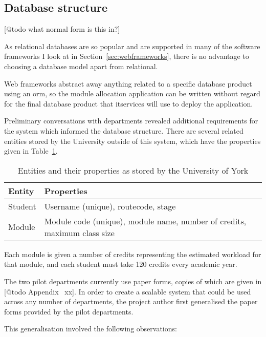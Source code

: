
\subsection{Database structure}

[@todo what normal form is this in?]

As relational databases are so popular and are supported in many of the
software frameworks I look at in Section~\ref{sec:webframeworks}, there is no
advantage to choosing a database model apart from relational.

Web frameworks abstract away anything related to a specific database product
using an \gls{orm}, so the module allocation application can be written
without regard for the final database product that \gls{itservices} will use
to deploy the application.

Preliminary conversations with departments revealed additional requirements
for the system which informed the database structure. There are several
related entities stored by the University outside of this system, which have
the properties given in Table~\ref{development_database_uni_entities}.

\begin{table}
  \begin{tabular}{ | l | l | }
    \hline
    \textbf{Entity} & \textbf{Properties} \\
    \hline
    Student    & Username (unique), \gls{routecode}, \gls{stage} \\
    Module     & Module code (unique), module name, number of credits, maximum class size \\
    \hline
  \end{tabular}
  \caption{Entities and their properties as stored by the University of York}
  \label{development_database_uni_entities}
\end{table}

Each module is given a number of credits representing the estimated workload
for that module, and each student must take 120 credits every academic year.

The two pilot departments currently use paper forms, copies of which are given
in [@todo Appendix~ xx]. In order to create a scalable system that could be
used across any number of departments, the project author first generalised
the paper forms provided by the pilot departments.

This generalisation involved the following observations:

